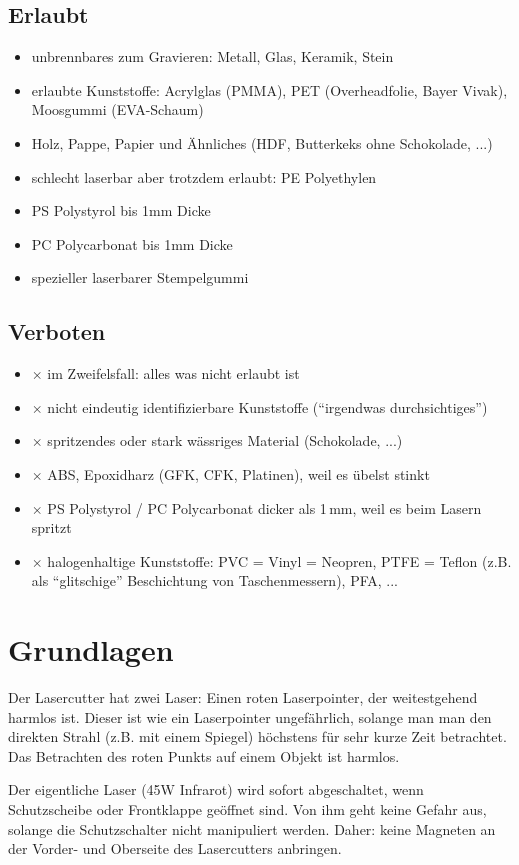 \documentclass{\basedir/fablab-document}
\begin{document}
\subsection{Erlaubt}
\newcommand{\itemCheck}{\item[\checkmark]}
\begin{itemize}
\itemCheck unbrennbares zum Gravieren: Metall, Glas, Keramik, Stein
\itemCheck erlaubte Kunststoffe: Acrylglas (PMMA), PET (Overheadfolie, Bayer Vivak), Moosgummi (EVA-Schaum)
\itemCheck Holz, Pappe, Papier und Ähnliches (HDF, Butterkeks ohne Schokolade, ...)
\itemCheck schlecht laserbar aber trotzdem erlaubt: PE Polyethylen
\itemCheck PS Polystyrol bis 1mm Dicke %
\itemCheck PC Polycarbonat bis 1mm Dicke %
\itemCheck spezieller laserbarer Stempelgummi
\end{itemize}

\subsection{Verboten}
\newcommand{\itemCross}{\item[$\times$]}
\begin{itemize}
\itemCross im Zweifelsfall: alles was nicht erlaubt ist
\itemCross nicht eindeutig identifizierbare Kunststoffe (\enquote{irgendwas durchsichtiges})
\itemCross spritzendes oder stark wässriges Material (Schokolade, ...)
\itemCross ABS, Epoxidharz (GFK, CFK, Platinen), weil es übelst stinkt
\itemCross PS Polystyrol / PC Polycarbonat dicker als 1\,mm, weil es beim Lasern spritzt
\itemCross halogenhaltige Kunststoffe: PVC = Vinyl = Neopren, PTFE = Teflon (z.B. als \enquote{glitschige} Beschichtung von Taschenmessern), PFA, ...
\end{itemize}

\section{Grundlagen}
Der Lasercutter hat zwei Laser: Einen roten Laserpointer, der weitestgehend harmlos ist. Dieser ist wie ein Laserpointer ungefährlich, solange man man den direkten Strahl (z.B. mit einem Spiegel) höchstens für sehr kurze Zeit betrachtet. Das Betrachten des roten Punkts auf einem Objekt ist harmlos.

Der eigentliche Laser (45W Infrarot) wird sofort abgeschaltet, wenn Schutzscheibe oder Frontklappe geöffnet sind. Von ihm geht keine Gefahr aus, solange die Schutzschalter nicht manipuliert werden. Daher: keine Magneten an der Vorder- und Oberseite des Lasercutters anbringen.
\end{document}
